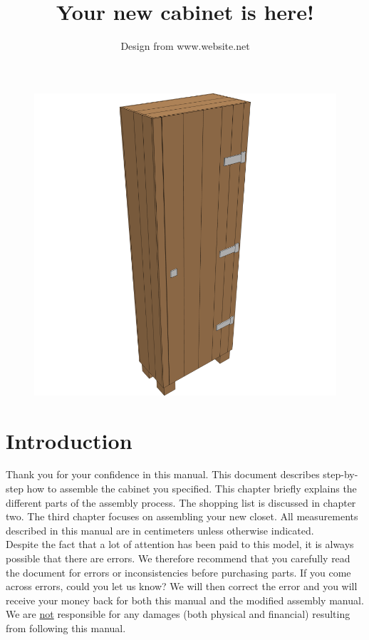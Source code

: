 \documentclass{article}
\title{Your new cabinet is here!}
\author{Design from www.website.net}
\begin{document}
\maketitle

\begin{figure}[h!]
    \centering
    \includegraphics[width=\textwidth]{scene 12 - compleet.png}
\end{figure}

\clearpage
\newpage

\tableofcontents

\clearpage
\newpage

\section{Introduction}

Thank you for your confidence in this manual. This document describes step-by-step how to assemble the cabinet you specified. This chapter briefly explains the different parts of the assembly process. The shopping list is discussed in chapter two. The third chapter focuses on assembling your new closet. All measurements described in this manual are in centimeters unless otherwise indicated. \\

Despite the fact that a lot of attention has been paid to this model, it is always possible that there are errors. We therefore recommend that you carefully read the document for errors or inconsistencies before purchasing parts. If you come across errors, could you let us know? We will then correct the error and you will receive your money back for both this manual and the modified assembly manual. We are \underline{not} responsible for any damages (both physical and financial) resulting from following this manual. \\
\end{document}
